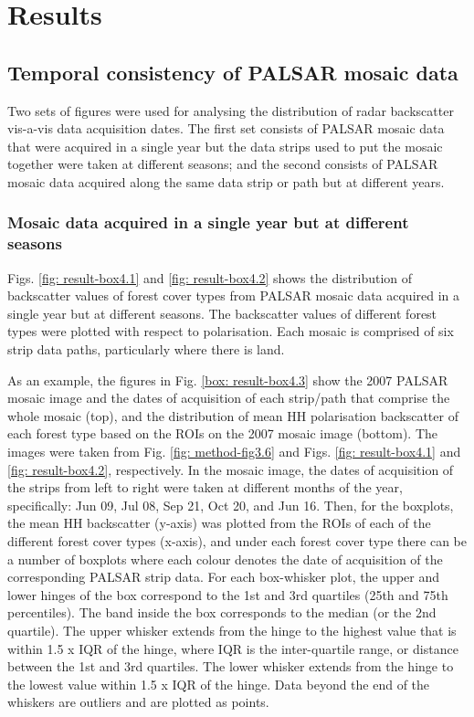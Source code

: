 
\chapter{Results}
\label{cha: results}

\section{Temporal consistency of PALSAR mosaic data}
\label{sec: result-temporal-consistency}

Two sets of figures were used for analysing the distribution of radar backscatter vis-a-vis data acquisition dates. The first set consists of PALSAR mosaic data that were acquired in a single year but the data strips used to put the mosaic together were taken at different seasons; and the second consists of PALSAR mosaic data acquired along the same data strip or path but at different years.

\subsection{Mosaic data acquired in a single year but at different seasons}

Figs. \ref{fig: result-box4.1} and \ref{fig: result-box4.2} shows the distribution of backscatter values of forest cover types from PALSAR mosaic data acquired in a single year but at different seasons. The backscatter values of different forest types were plotted with respect to polarisation. Each mosaic is comprised of six strip data paths, particularly where there is land.

As an example, the figures in Fig. \ref{box: result-box4.3} show the 2007 PALSAR mosaic image and the dates of acquisition of each strip/path that comprise the whole mosaic (top), and the distribution of mean HH polarisation backscatter of each forest type based on the ROIs on the 2007 mosaic image (bottom). The images were taken from Fig. \ref{fig: method-fig3.6} and Figs. \ref{fig: result-box4.1} and \ref{fig: result-box4.2}, respectively. In the mosaic image, the dates of acquisition of the strips from left to right were taken at different months of the year, specifically: Jun 09, Jul 08, Sep 21, Oct 20, and Jun 16. Then, for the boxplots, the mean HH backscatter (y-axis) was plotted from the ROIs of each of the different forest cover types (x-axis), and under each forest cover type there can be a number of boxplots where each colour denotes the date of acquisition of the corresponding PALSAR strip data. For each box-whisker plot, the upper and lower hinges of the box correspond to the 1st and 3rd quartiles (25th and 75th percentiles). The band inside the box corresponds to the median (or the 2nd quartile). The upper whisker extends from the hinge to the highest value that is within 1.5 x IQR of the hinge, where IQR is the inter-quartile range, or distance between the 1st and 3rd quartiles. The lower whisker extends from the hinge to the lowest value within 1.5 x IQR of the hinge. Data beyond the end of the whiskers are outliers and are plotted as points.

